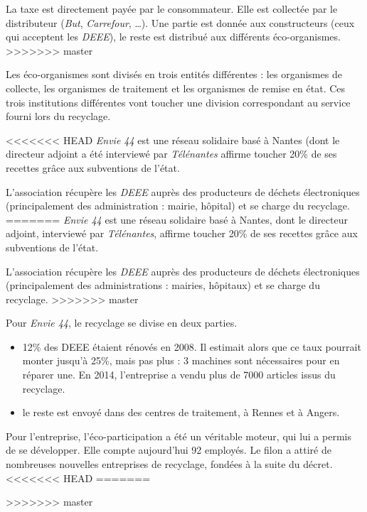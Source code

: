 La taxe est directement payée par le consommateur. Elle est collectée par le distributeur (\textit{But}, \textit{Carrefour}, \dots). Une partie est donnée aux constructeurs (ceux qui acceptent les \textit{DEEE}), le reste est distribué aux différents éco-organismes. 
>>>>>>> master

Les éco-organismes sont divisés en trois entités différentes : les organismes de collecte, les organismes de traitement et les organismes de remise en état. Ces trois institutions différentes vont toucher une division correspondant au service fourni lors du recyclage. 

\medbreak


<<<<<<< HEAD
\textit{Envie 44}  est une réseau solidaire basé à Nantes (dont le directeur adjoint a été interviewé par \textit{Télénantes} affirme toucher 20\% de ses recettes grâce aux subventions de l'état\cite{7andco}.

L'association récupère les \textit{DEEE} auprès des producteurs de déchets électroniques (principalement des administration : mairie, hôpital) et se charge du recyclage. 
=======
\textit{Envie 44}  est une réseau solidaire basé à Nantes, dont le directeur adjoint, interviewé par \textit{Télénantes}, affirme toucher 20\% de ses recettes grâce aux subventions de l'état\cite{7andco}.

L'association récupère les \textit{DEEE} auprès des producteurs de déchets électroniques (principa\-lement des administrations : mairies, hôpitaux) et se charge du recyclage. 
>>>>>>> master

Pour \textit{Envie 44}, le recyclage se divise en deux parties. 
\begin{itemize}
\item 12\% des DEEE étaient rénovés en 2008. Il estimait alors que ce taux pourrait monter jusqu'à 25\%, mais pas plus : 3 machines sont nécessaires pour en réparer une. En 2014, l'entreprise a vendu plus de 7000 articles issus du recyclage. 
\item le reste est envoyé dans des centres de traitement, à Rennes et à Angers.
\end{itemize}

Pour l'entreprise, l'éco-participation a été un véritable moteur, qui lui a permis de se développer. Elle compte aujourd'hui 92 employés. Le filon a attiré de nombreuses nouvelles entreprises de recyclage, fondées à la suite du décret. 
<<<<<<< HEAD
=======

\bigbreak
>>>>>>> master

